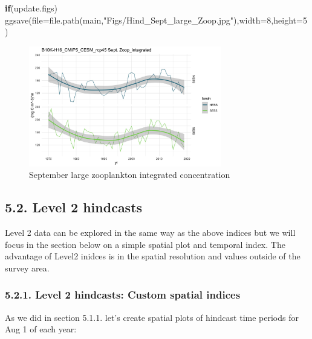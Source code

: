 \documentclass[
]{article}
\newenvironment{Shaded}{\begin{snugshade}}{\end{snugshade}}
\newcommand{\AttributeTok}[1]{\textcolor[rgb]{0.77,0.63,0.00}{#1}}
\newcommand{\ControlFlowTok}[1]{\textcolor[rgb]{0.13,0.29,0.53}{\textbf{#1}}}
\newcommand{\DecValTok}[1]{\textcolor[rgb]{0.00,0.00,0.81}{#1}}
\newcommand{\FunctionTok}[1]{\textcolor[rgb]{0.00,0.00,0.00}{#1}}
\newcommand{\NormalTok}[1]{#1}
\newcommand{\StringTok}[1]{\textcolor[rgb]{0.31,0.60,0.02}{#1}}
\begin{document}
\begin{Shaded}
\begin{Highlighting}[]
  \ControlFlowTok{if}\NormalTok{(update.figs)  }
    \FunctionTok{ggsave}\NormalTok{(}\AttributeTok{file=}\FunctionTok{file.path}\NormalTok{(main,}\StringTok{"Figs/Hind\_Sept\_large\_Zoop.jpg"}\NormalTok{),}\AttributeTok{width=}\DecValTok{8}\NormalTok{,}\AttributeTok{height=}\DecValTok{5}\NormalTok{)}
\end{Highlighting}
\end{Shaded}

\begin{figure}
\centering
\includegraphics[width=0.75\textwidth,height=\textheight]{Figs/Hind_Sept_large_Zoop.jpg}
\caption{September large zooplankton integrated concentration}
\end{figure}

\hypertarget{level-2-hindcasts}{%
\subsection{5.2. Level 2 hindcasts}\label{level-2-hindcasts}}

Level 2 data can be explored in the same way as the above indices but we
will focus in the section below on a simple spatial plot and temporal
index. The advantage of Level2 inidces is in the spatial resolution and
values outside of the survey area.

\hypertarget{level-2-hindcasts-custom-spatial-indices}{%
\subsubsection{5.2.1. Level 2 hindcasts: Custom spatial
indices}\label{level-2-hindcasts-custom-spatial-indices}}

As we did in section 5.1.1. let's create spatial plots of hindcast time
periods for Aug 1 of each year:
\end{document}
